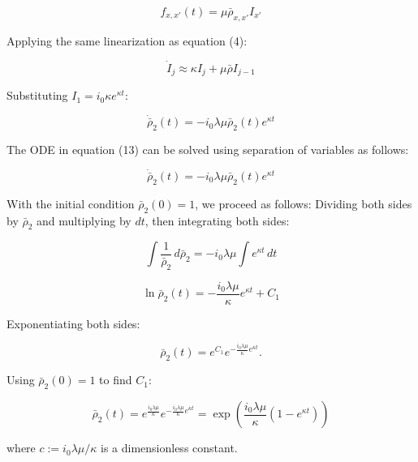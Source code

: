 \begin{equation}
f_{x,x'}(t) = \mu \bar \rho_{x,x'} I_{x'}
\end{equation}

Applying the same linearization as equation (4):

\begin{equation}
\dot I_j \approx \kappa I_j + \mu \bar \rho I_{j-1} 
\end{equation}

Substituting $I_1 = i_0 \kappa e^{\kappa t}$:

\begin{equation}
\dot{\bar{\rho}}_2(t) = - i_{0} \lambda \mu \bar \rho_{2}(t) e^{\kappa t}
\end{equation}

The ODE in equation (13) can be solved using separation of variables as follows:

\begin{equation}
\dot{\bar{\rho}}_2(t) = - i_{0} \lambda \mu \bar \rho_{2}(t) e^{\kappa t}
\end{equation}

With the initial condition $\bar \rho_{2}(0) = 1$, we proceed as follows:
Dividing both sides by $\bar \rho_{2}$ and multiplying by $dt$, then integrating both sides:

\begin{equation}
\int \frac{1}{\bar \rho_{2}} \, d\bar \rho_{2} = - i_{0} \lambda \mu \int e^{\kappa t} \, dt
\end{equation}

\begin{equation}
\ln \bar \rho_{2}(t) = - \frac{i_{0} \lambda \mu}{\kappa} e^{\kappa t} + C_1
\end{equation}

Exponentiating both sides:

\begin{equation}
\bar \rho_{2}(t) = e^{C_1} e^{-\frac{i_{0} \lambda \mu}{\kappa} e^{\kappa t}}.
\end{equation}

Using $\bar \rho_{2}(0) = 1$ to find $C_1$:

\begin{equation}
\bar \rho_{2}(t) = e^{\frac{i_{0} \lambda \mu}{\kappa}} e^{-\frac{i_{0} \lambda \mu}{\kappa} e^{\kappa t}}
 = \exp\left(\frac{i_{0} \lambda \mu}{\kappa} \left( 1 - e^{\kappa t} \right)\right) 
\end{equation}

where $c := i_{0} \lambda \mu / \kappa$ is a dimensionless constant.

